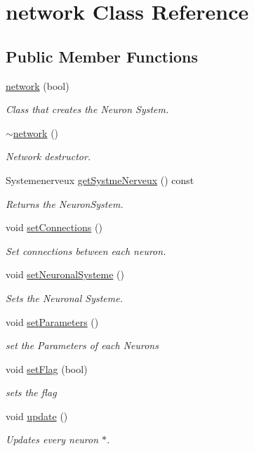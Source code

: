 \hypertarget{classnetwork}{}\section{network Class Reference}
\label{classnetwork}
\subsection*{Public Member Functions}
\begin{DoxyCompactItemize}
\item 
\hyperlink{classnetwork_aac44f197a402ad67d1e7b266221bcca4}{network} (bool)
\begin{DoxyCompactList}\small\item\em Class that creates the Neuron System. \end{DoxyCompactList}\item 
\hyperlink{classnetwork_a37b843338509d5a411b3efe2b702da15}{$\sim$network} ()
\begin{DoxyCompactList}\small\item\em Network destructor. \end{DoxyCompactList}\item 
Systemenerveux \hyperlink{classnetwork_af0a14e17b85528ee182e35127de7e2b5}{get\+Systme\+Nerveux} () const
\begin{DoxyCompactList}\small\item\em Returns the Neuron\+System. \end{DoxyCompactList}\item 
void \hyperlink{classnetwork_acf46b197f5e56df426dc3f105add3e97}{set\+Connections} ()
\begin{DoxyCompactList}\small\item\em Set connections between each neuron. \end{DoxyCompactList}\item 
void \hyperlink{classnetwork_af9105fac7338bbd113d0823f837cf217}{set\+Neuronal\+Systeme} ()
\begin{DoxyCompactList}\small\item\em Sets the Neuronal Systeme. \end{DoxyCompactList}\item 
void \hyperlink{classnetwork_a6dda83ae384498619f0aa876639b2c25}{set\+Parameters} ()
\begin{DoxyCompactList}\small\item\em set the Parameters of each Neurons \end{DoxyCompactList}\item 
void \hyperlink{classnetwork_adec3ef8128235b2dc6d4d9df34e211b7}{set\+Flag} (bool)
\begin{DoxyCompactList}\small\item\em sets the flag \end{DoxyCompactList}\item 
void \hyperlink{classnetwork_ae522c71a541b541797dcf0aa3a4787dd}{update} ()
\begin{DoxyCompactList}\small\item\em Updates every neuron $\ast$. \end{DoxyCompactList}\end{DoxyCompactItemize}


